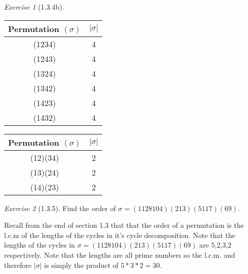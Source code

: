 \documentclass[12pt]{amsart}
\makeatletter
\theoremstyle{remark}
\newtheorem*{exercise}{Exercise}%
\renewenvironment{proof}[1][\proofname]{\par\doublespacing
  \pushQED{\qed}%
  \normalfont \topsep6\p@\@plus6\p@\relax
  \list{}{%
    \settowidth{\leftmargin}{\itshape\proofname:\hskip\labelsep}%
    \setlength{\labelwidth}{0pt}%
    \setlength{\itemindent}{-\leftmargin}%
  }%
  \item[\hskip\labelsep\itshape#1\@addpunct{:}]\ignorespaces
}{%
  \popQED\endlist\@endpefalse
  \singlespacing
}
\theoremstyle{mycomment}
\makeatother
\begin{document}
\begin{exercise}[1.3.4b]
\begin{proof}[Solution:]
  \begin{center}
    \begin{minipage}{.45\textwidth}
          \begin{tabular}{c | c } 
            Permutation $(\sigma)$ & $|\sigma|$ \\ 
            \hline
            (1234) & 4\\
            (1243) & 4\\
            (1324) & 4\\
            (1342) & 4\\
            (1423) & 4\\
            (1432) & 4
          \end{tabular}
        \end{minipage}
        \hfill
        \begin{minipage}{.45\textwidth}
            \begin{tabular}{c | c } 
              Permutation $(\sigma)$ & $|\sigma|$ \\ 
              \hline
              (12)(34)& 2\\
              (13)(24)& 2\\
              (14)(23)& 2
            \end{tabular}
          \end{minipage}     
        \end{center}




        
      
        
  \end{proof}
  
\end{exercise}


\begin{exercise}[1.3.5] Find the order of $\sigma = (1 12 8 10 4)(2 13)(5 11 7)(6 9)$.
  \begin{proof}[Solution:] Recall from the end of section 1.3 that that the order of a permutation is the l.c.m of the lengths of the cycles in it's cycle decomposition.
    Note that the lengths of the cycles in $\sigma = (1 12 8 10 4)(2 13)(5 11 7)(6 9)$ are 5,2,3,2 respectively. Note that the lengths are
    all prime numbers so the l.c.m. and therefore $|\sigma|$ is simply the product of $5*3*2 = 30$.
  \end{proof}
\end{exercise}
\end{document}
